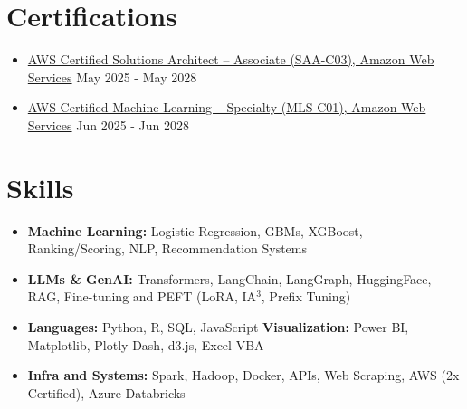 \documentclass[letterpaper,11pt]{article}
\newcommand{\resumeItem}[1]{
  \item{\small{#1}}
}
\newcommand{\resumeItemListStart}{
\vspace{-1pt}
  \begin{itemize}[leftmargin=0.18in, label=\textbullet]
}
\newcommand{\resumeItemListEnd}{\end{itemize}}
\begin{document}
\section{Certifications}
\vspace{2pt}

\resumeItemListStart

\resumeItem{
\href{\salink}{{AWS Certified Solutions Architect – Associate (SAA-C03), Amazon Web Services}} 
\hfill{May 2025 - May 2028}}

\vspace{-5pt}
\resumeItem{
\href{\mllink}{{AWS Certified Machine Learning – Specialty (MLS-C01), Amazon Web Services}} 
\hfill{Jun 2025 - Jun 2028}}


\resumeItemListEnd
\vspace{-21pt}




\section{Skills}
\begin{itemize}[leftmargin=0.00in, label={}, itemsep=2px, parsep=-1pt]


\item{
{\textbf{Machine Learning:} Logistic Regression, GBMs, XGBoost, Ranking/Scoring, NLP, Recommendation Systems
}}

\item{
{\textbf{LLMs \& GenAI:} Transformers, LangChain, LangGraph, HuggingFace, RAG, Fine-tuning and PEFT (LoRA, IA$^3$, Prefix Tuning)
}}







\item{
{\textbf{Languages:} Python, R, SQL,  JavaScript}\hspace{0.8cm}
\small{\textbf{Visualization:} Power BI, Matplotlib, Plotly Dash, d3.js, Excel VBA}
}







\item{
\small{\textbf{Infra and Systems:} Spark, Hadoop, Docker, APIs, Web Scraping, AWS (2x Certified), Azure Databricks}
}















\end{itemize}
\vspace{-21pt}
\end{document}
